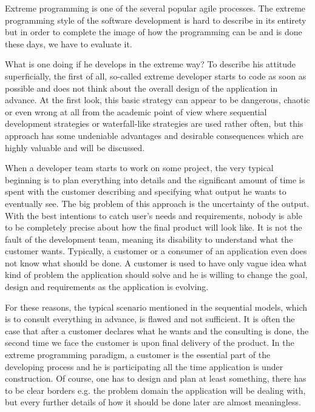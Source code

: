 \documentclass[12pt,final,oneside]{fithesis}
\begin{document}
Extreme programming is one of the several popular agile processes. The extreme programming style of the software development is hard to describe in its entirety but in order to complete the image of how the programming can be and is done these days, we have to evaluate it.

What is one doing if he develops in the extreme way? To describe his attitude superficially, the first of all, so-called extreme developer starts to code as soon as possible and does not think about the overall design of the application in advance. At the first look, this basic strategy can appear to be dangerous, chaotic or even wrong at all from the academic point of view where sequential development strategies or waterfall-like strategies are used rather often, but this approach has some undeniable advantages and desirable consequences which are highly valuable and will be discussed.

When a developer team starts to work on some project, the very typi\-cal beginning is to plan everything into details and the significant amount of time is spent with the customer describing and specifying what output he wants to eventually see. The big problem of this app\-roach is the uncertainty of the output. With the best intentions to catch user's needs and requirements, nobody is able to be completely precise about how the final product will look like. It is not the fault of the development team, meaning its disability to understand what the customer wants. Typically, a customer or a consumer of an application even does not know what should be done. A customer is used to have only vague idea what kind of problem the application should solve and he is willing to change the goal, design and requirements as the application is evolving.

For these reasons, the typical scenario mentioned in the sequential models, which is to consult everything in advance, is flawed and not sufficient. It is often the case that after a customer declares what he wants and the consulting is done, the second time we face the customer is upon final delivery of the product. In the extreme programming paradigm, a customer is the essential part of the developing process and he is participating all the time application is under construction. Of course, one has to design and plan at least something, there has to be clear borders e.g. the problem domain the application will be dealing with, but every further details of how it should be done later are almost meaningless.
\end{document}
